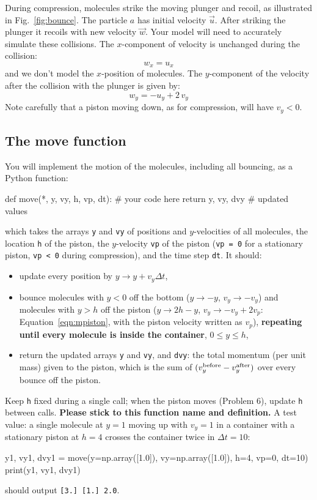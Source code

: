 \documentclass[12pt]{article}
\begin{document}
\noindent
During compression, molecules strike the moving plunger and recoil, as
illustrated in Fig.~\ref{fig:bounce}.  The particle $a$ has initial
velocity $\vec{u}$.  After striking the plunger it recoils with new
velocity $\vec{w}$.  Your model will need to accurately simulate these
collisions.  The $x$-component of velocity is unchanged during the
collision:
$$w_x = u_x$$
and we don't model the $x$-position of molecules.  The $y$-component of the velocity after the collision with the plunger is given by:
\begin{equation}
\label{eqn:mpiston}
w_y = -u_y + 2 \, v_y
\end{equation}
Note carefully that a piston moving down, as for compression, will have $v_y < 0$.

\subsection*{The move function}

\noindent
You will implement the motion of the molecules, including all bouncing, as a Python function:
\begin{python}
def move(*, y, vy, h, vp, dt):
    # your code here
    return y, vy, dvy # updated values
\end{python}
which takes the arrays {\tt y} and {\tt vy} of positions and $y$-velocities of all molecules, the
location {\tt h} of the piston, the $y$-velocity {\tt vp} of the piston ({\tt vp = 0} for a
stationary piston, {\tt vp < 0} during compression), and the time step {\tt dt}.  It should:
\begin{itemize}
\item update every position by $y \to y + v_y \Delta t$,
\item bounce molecules with $y < 0$ off the bottom ($y \to -y$, $v_y \to -v_y$) and molecules with
  $y > h$ off the piston ($y \to 2h - y$, $v_y \to -v_y + 2 v_p$: Equation~\ref{eqn:mpiston}, with the piston velocity written as $v_p$),
  {\bf repeating until every molecule is inside the container}, $0 \le y \le h$,
\item return the updated arrays {\tt y} and {\tt vy}, and {\tt dvy}: the total momentum (per unit
  mass) given to the piston, which is the sum of $(v_y^{\rm before} - v_y^{\rm after})$ over every bounce off the piston.
\end{itemize}
Keep {\tt h} fixed during a single call; when the piston moves (Problem 6), update {\tt h} between calls.
{\bf Please stick to this function name and definition.}  A test value: a single molecule at
$y=1$ moving up with $v_y = 1$ in a container with a stationary piston at $h=4$ crosses the
container twice in $\Delta t = 10$:
\begin{python}
y1, vy1, dvy1 = move(y=np.array([1.0]), vy=np.array([1.0]), h=4, vp=0, dt=10)
print(y1, vy1, dvy1)
\end{python}
should output {\tt [3.] [1.] 2.0}.
\end{document}
